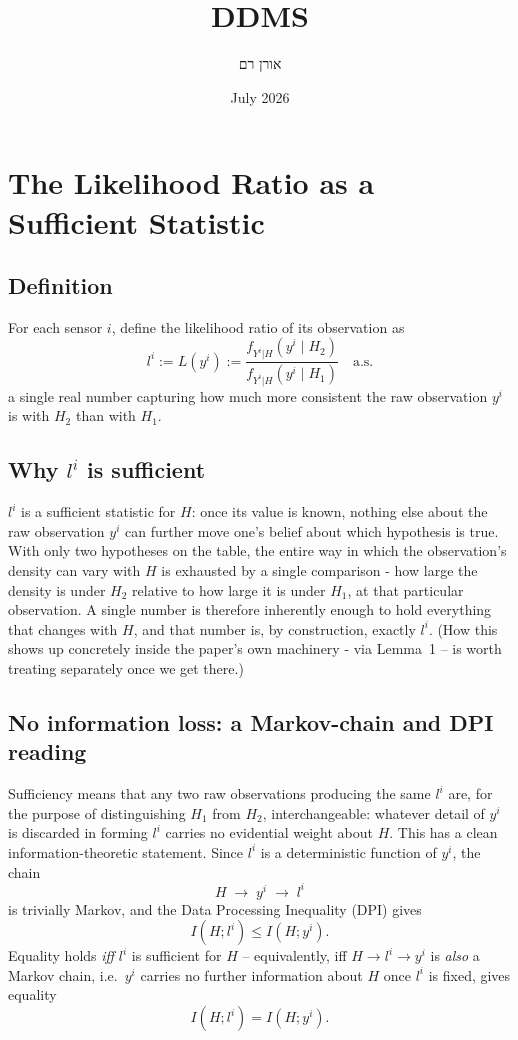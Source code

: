\documentclass{article}
\title{DDMS}
\author{אורן רם}
\date{July 2026}
\begin{document}
\section{The Likelihood Ratio as a Sufficient Statistic}

\subsection{Definition}
For each sensor $i$, define the likelihood ratio of its observation as
\begin{equation}
    l^i := L(y^i) := \frac{f_{Y^i|H}(y^i \mid H_2)}{f_{Y^i|H}(y^i \mid H_1)}
    \quad \text{a.s.}
    \label{eq:likelihood-ratio}
\end{equation}
a single real number capturing how much more consistent the raw observation $y^i$
is with $H_2$ than with $H_1$.

\subsection{Why $l^i$ is sufficient}
$l^i$ is a sufficient statistic for $H$: once its value is known, nothing else
about the raw observation $y^i$ can further move one's belief about which
hypothesis is true. With only two hypotheses on the table, the entire way in which
the observation's density can vary with $H$ is exhausted by a single comparison -
how large the density is under $H_2$ relative to how large it is under $H_1$, at
that particular observation. A single number is therefore inherently enough to
hold everything that changes with $H$, and that number is, by construction,
exactly $l^i$. (How this shows up concretely inside the paper's own machinery -
via Lemma~1 -- is worth treating separately once we get there.)

\subsection{No information loss: a Markov-chain and DPI reading}
Sufficiency means that any two raw observations producing the same $l^i$ are, for
the purpose of distinguishing $H_1$ from $H_2$, interchangeable: whatever detail of
$y^i$ is discarded in forming $l^i$ carries no evidential weight about $H$. This
has a clean information-theoretic statement. Since $l^i$ is a deterministic
function of $y^i$, the chain
\[
    H \;\to\; y^i \;\to\; l^i
\]
is trivially Markov, and the Data Processing Inequality (DPI) gives
\begin{equation}
    I(H; l^i) \le I(H; y^i).
\end{equation}
Equality holds \emph{iff} $l^i$ is sufficient for $H$ -- equivalently, iff
$H \to l^i \to y^i$ is \emph{also} a Markov chain, i.e.\ $y^i$ carries no further
information about $H$ once $l^i$ is fixed, gives equality
\begin{equation}
    I(H; l^i) = I(H; y^i).
\end{equation}
\end{document}
